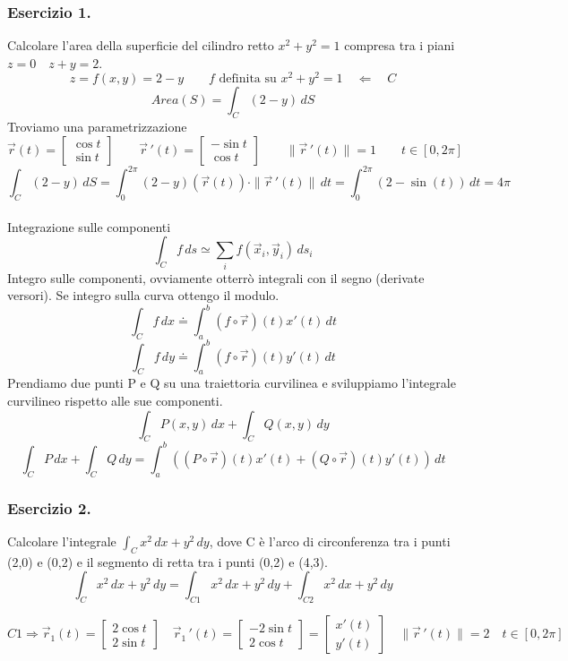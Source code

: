 \documentclass[10pt]{article}
\theoremstyle{plain}
\theoremstyle{definition}
\begin{document}
\subsubsection{Esercizio 1.}
Calcolare l'area della superficie del cilindro retto $x^2+y^2=1$ compresa tra i piani $z=0 \quad z+y=2$.
$$z= f(x,y) = 2-y \qquad f \text{ definita su } x^2+y^2=1 \quad \Leftarrow \quad C$$
$$Area(S) = \int_C (2-y)\,dS$$
Troviamo una parametrizzazione 
$$\vec{r}(t)= \begin{bmatrix} \cos t \\ \sin t \end{bmatrix} \qquad \vec{r}\,'(t)= \begin{bmatrix} - \sin t \\ \cos t \end{bmatrix} \qquad \| \vec{r}\,'(t) \| = 1 \qquad t \in [0,2\pi]$$
$$\int_C (2-y)\,dS = \int_0^{2 \pi} (2-y) (\vec{r}(t)) \cdot \| \vec{r}\,'(t) \| \,dt = \int_0^{2 \pi} (2- \sin (t))\,dt = 4 \pi$$
\\
Integrazione sulle componenti
\\
$$\int_C f\,ds \simeq \sum_i f(\vec{x}_i , \vec{y}_i)\,ds_i $$
Integro sulle componenti, ovviamente otterrò integrali con il segno (derivate versori). Se integro sulla curva ottengo il modulo.
$$\int_C f\,dx \doteq \int_a^b (f \circ \vec{r})(t) x'(t) \,dt $$
$$ \int_C f\,dy \doteq \int_a^b (f \circ \vec{r})(t) y'(t) \,dt$$
Prendiamo due punti P e Q su una traiettoria curvilinea e sviluppiamo l'integrale curvilineo rispetto alle sue componenti.
$$\int_C P(x,y)\,dx + \int_C Q(x,y)\,dy$$
$$\int_C P\,dx + \int_C Q\,dy = \int_a^b ((P \circ \vec{r})(t)x'(t) + (Q \circ \vec{r})(t)y'(t))\,dt$$

\subsubsection{Esercizio 2.}

Calcolare l'integrale $\int_C x^2 \,dx + y^2 \,dy$, dove C è l'arco di circonferenza tra i punti (2,0) e (0,2) e il segmento di retta tra i punti (0,2) e (4,3).
$$\int_C x^2 \,dx + y^2 \,dy = \int_{C1} x^2\,dx +y^2 \,dy + \int_{C2} x^2 \,dx + y^2 \,dy$$

$$C1 \Rightarrow \vec{r}_1(t) = \begin{bmatrix} 2\cos t \\ 2\sin t \end{bmatrix} \quad \vec{r}_1 \,' (t) = \begin{bmatrix} -2\sin t \\ 2\cos t \end{bmatrix} = \begin{bmatrix} x'(t) \\ y'(t)\end{bmatrix} \quad \| \vec{r}\,'(t) \| = 2 \quad t \in [0,2\pi]$$
\end{document}
